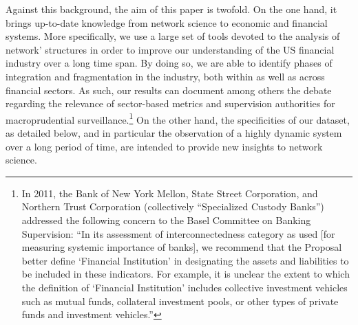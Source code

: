 \documentclass[a4paper,10pt]{article}
\begin{document}
Against this background, the aim of this paper is twofold. On the one hand, it brings up-to-date knowledge from network 
science to economic and financial systems. More specifically, we use a large set of tools devoted to the analysis of network'
structures in order to  improve our understanding of the US financial industry over a long time span. By doing so, we are able
to identify  phases of integration and fragmentation in the industry, both within as well as across financial sectors. As
such, our results can document among others the   debate regarding the relevance of sector-based  metrics and supervision
authorities for macroprudential surveillance.\footnote{In 2011, the Bank of New York Mellon, State Street Corporation, and
Northern Trust Corporation (collectively “Specialized Custody Banks”) addressed the following concern to the Basel Committee 
on Banking Supervision: “In its assessment of interconnectedness category as used [for measuring systemic importance of banks],
we recommend that the Proposal better define ‘Financial Institution’ in designating the assets and liabilities to be included 
in these indicators. For example, it is unclear the extent to which the definition of ‘Financial Institution’ includes 
collective investment vehicles such as mutual funds, collateral investment pools, or other types of private funds and
investment vehicles.”} On the other hand, the specificities of our dataset, as detailed below, and in particular the 
observation of a highly dynamic system over a long period of time, are intended to provide new insights to network science. 
 
\end{document}
